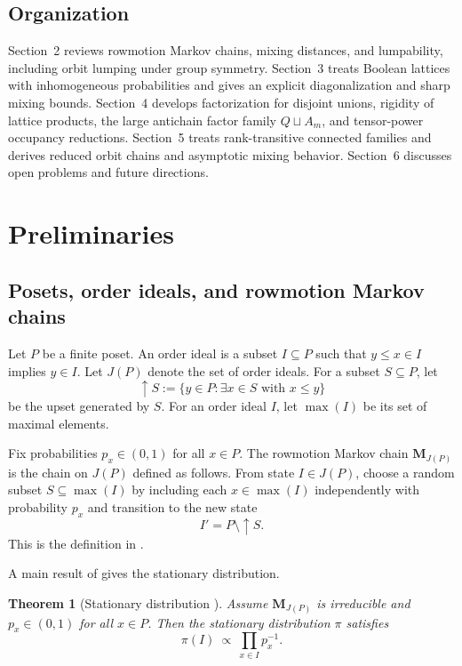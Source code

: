 \documentclass[final,3p,times]{elsarticle}
\newtheorem{theorem}{Theorem}[section]
\theoremstyle{definition}
\begin{document}
\subsection{Organization}

Section~2 reviews rowmotion Markov chains, mixing distances, and lumpability, including orbit lumping under group symmetry.
Section~3 treats Boolean lattices with inhomogeneous probabilities and gives an explicit diagonalization and sharp mixing bounds.
Section~4 develops factorization for disjoint unions, rigidity of lattice products, the large antichain factor family $Q\sqcup A_m$, and tensor-power occupancy reductions.
Section~5 treats rank-transitive connected families and derives reduced orbit chains and asymptotic mixing behavior.
Section~6 discusses open problems and future directions.

\section{Preliminaries}

\subsection{Posets, order ideals, and rowmotion Markov chains}

Let $P$ be a finite poset.
An order ideal is a subset $I\subseteq P$ such that $y\le x\in I$ implies $y\in I$.
Let $J(P)$ denote the set of order ideals.
For a subset $S\subseteq P$, let
\[
\uparrow S:=\{y\in P: \exists x\in S\text{ with }x\le y\}
\]
be the upset generated by $S$.
For an order ideal $I$, let $\max(I)$ be its set of maximal elements.

Fix probabilities $p_x\in(0,1)$ for all $x\in P$.
The rowmotion Markov chain $\mathbf{M}_{J(P)}$ is the chain on $J(P)$ defined as follows.
From state $I\in J(P)$, choose a random subset $S\subseteq \max(I)$ by including each $x\in \max(I)$ independently with probability $p_x$ and transition to the new state
\[
I' = P\setminus \uparrow S.
\]
This is the definition in \cite{DefantLiNestoridi2024Rowmotion}.

A main result of \cite{DefantLiNestoridi2024Rowmotion} gives the stationary distribution.

\begin{theorem}[Stationary distribution \cite{DefantLiNestoridi2024Rowmotion}]\label{thm:DLN_stationary}
Assume $\mathbf{M}_{J(P)}$ is irreducible and $p_x\in(0,1)$ for all $x\in P$.
Then the stationary distribution $\pi$ satisfies
\[
\pi(I)\ \propto\ \prod_{x\in I} p_x^{-1}.
\]
\end{theorem}
\end{document}
